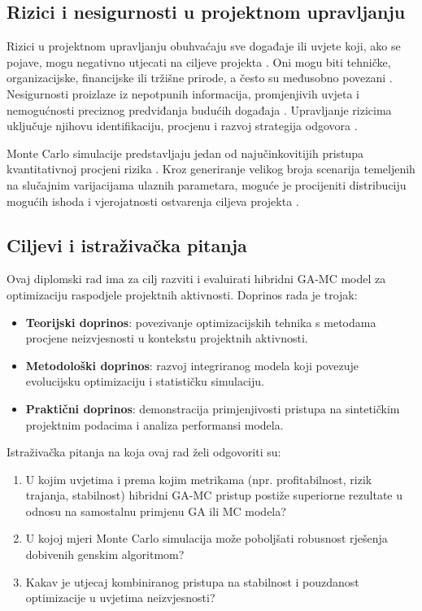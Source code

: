 \subsection{Rizici i nesigurnosti u projektnom upravljanju}
Rizici u projektnom upravljanju obuhvaćaju sve događaje ili uvjete koji, ako se pojave, mogu negativno utjecati na ciljeve projekta \cite{Hillson2009}. Oni mogu biti tehničke, organizacijske, financijske ili tržišne prirode, a često su međusobno povezani \cite{PMI2021}. Nesigurnosti proizlaze iz nepotpunih informacija, promjenjivih uvjeta i nemogućnosti preciznog predviđanja budućih događaja \cite{Smith2014}. Upravljanje rizicima uključuje njihovu identifikaciju, procjenu i razvoj strategija odgovora \cite{Hillson2009}.

Monte Carlo simulacije predstavljaju jedan od najučinkovitijih pristupa kvantitativnoj procjeni rizika \cite{Vose2008}. Kroz generiranje velikog broja scenarija temeljenih na slučajnim varijacijama ulaznih parametara, moguće je procijeniti distribuciju mogućih ishoda i vjerojatnosti ostvarenja ciljeva projekta \cite{Rubinstein2016}.

\subsection{Ciljevi i istraživačka pitanja}
Ovaj diplomski rad ima za cilj razviti i evaluirati hibridni GA-MC model za optimizaciju raspodjele projektnih aktivnosti. Doprinos rada je trojak:
\begin{itemize}
    \item \textbf{Teorijski doprinos}: povezivanje optimizacijskih tehnika s metodama procjene neizvjesnosti u kontekstu projektnih aktivnosti.
    \item \textbf{Metodološki doprinos}: razvoj integriranog modela koji povezuje evolucijsku optimizaciju i statističku simulaciju.
    \item \textbf{Praktični doprinos}: demonstracija primjenjivosti pristupa na sintetičkim projektnim podacima i analiza performansi modela.
\end{itemize}

Istraživačka pitanja na koja ovaj rad želi odgovoriti su:
\begin{enumerate}
    \item  U kojim uvjetima i prema kojim metrikama (npr. profitabilnost, rizik trajanja, stabilnost) hibridni GA-MC pristup postiže superiorne rezultate u odnosu na samostalnu primjenu GA ili MC modela?   
    \item U kojoj mjeri Monte Carlo simulacija može poboljšati robusnost rješenja dobivenih genskim algoritmom?
    \item Kakav je utjecaj kombiniranog pristupa na stabilnost i pouzdanost optimizacije u uvjetima neizvjesnosti?
\end{enumerate}

